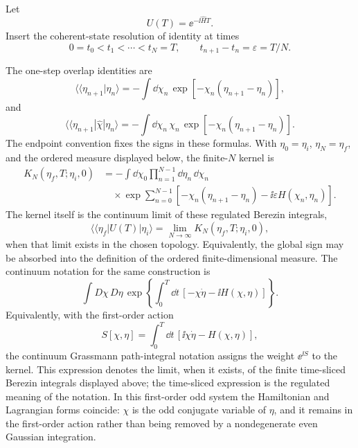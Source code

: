 Let
\[
  U(T)=\ee^{-\ii \widehat H T}.
\]
Insert the coherent-state resolution of identity at times
\[
  0=t_0<t_1<\cdots<t_N=T,
  \qquad
  t_{n+1}-t_n=\varepsilon=T/N.
\]
\begin{center}
\end{center}
The one-step overlap identities are
\[
  \langle\!\langle\eta_{n+1}|\eta_n\rangle
  =
  -\int\dd\chi_n\,
  \exp\!\left[-\chi_n(\eta_{n+1}-\eta_n)\right],
\]
and
\[
  \langle\!\langle\eta_{n+1}|\widehat\chi|\eta_n\rangle
  =
  -\int\dd\chi_n\,\chi_n\,
  \exp\!\left[-\chi_n(\eta_{n+1}-\eta_n)\right].
\]
The endpoint convention fixes the signs in these formulas. With
\(\eta_0=\eta_i\), \(\eta_N=\eta_f\), and the ordered measure displayed
below, the finite-\(N\) kernel is
\[
\begin{aligned}
  K_N(\eta_f,T;\eta_i,0)
  &=
  -\int
  \dd\chi_0
  \prod_{n=1}^{N-1}\dd\eta_n\,\dd\chi_n                 \\
  &\quad\times
  \exp
  \sum_{n=0}^{N-1}
  \left[
    -\chi_n(\eta_{n+1}-\eta_n)
    -\ii\varepsilon H(\chi_n,\eta_n)
  \right].
\end{aligned}
\]
The kernel itself is the continuum limit of these regulated Berezin
integrals,
\[
  \langle\!\langle\eta_f|U(T)|\eta_i\rangle
  =
  \lim_{N\to\infty}K_N(\eta_f,T;\eta_i,0),
\]
when that limit exists in the chosen topology. Equivalently, the global sign
may be absorbed into the definition of the ordered finite-dimensional measure.
The continuum notation for the same construction is
\[
  \int D\chi\,D\eta\,
  \exp\left\{
    \int_0^T\dd t\,
    \left[-\chi\dot\eta-\ii H(\chi,\eta)\right]
  \right\}.
\]
Equivalently, with the first-order action
\[
  S[\chi,\eta]
  =
  \int_0^T\dd t\,\left[\ii\chi\dot\eta-H(\chi,\eta)\right],
\]
the continuum Grassmann path-integral notation assigns the weight
\(\ee^{\ii S}\) to the kernel. This expression denotes the limit, when it exists,
of the finite time-sliced Berezin integrals displayed above; the time-sliced
expression is the regulated meaning of the notation.
In this first-order odd system the Hamiltonian and Lagrangian forms coincide:
\(\chi\) is the odd conjugate variable of \(\eta\), and it remains in the
first-order action rather than being removed by a nondegenerate even Gaussian
integration.

